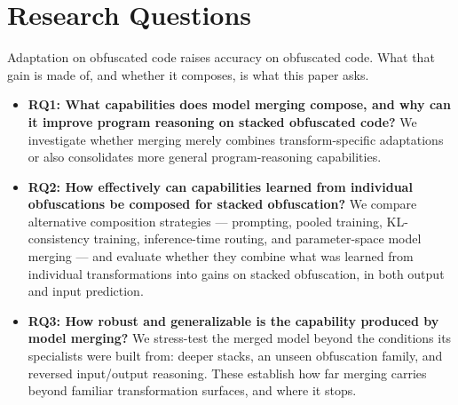 \section{Research Questions}
\label{sec:rqs}

Adaptation on obfuscated code raises accuracy on obfuscated code. What that gain is made of, and
whether it composes, is what this paper asks.

\begin{itemize}[leftmargin=*, topsep=2pt, itemsep=3pt]
  \item \textbf{RQ1: What capabilities does model merging compose, and why can it improve program
        reasoning on stacked obfuscated code?} We investigate whether merging merely combines
        transform-specific adaptations or also consolidates more general program-reasoning
        capabilities.

  \item \textbf{RQ2: How effectively can capabilities learned from individual obfuscations be
        composed for stacked obfuscation?} We compare alternative composition strategies ---
        prompting, pooled training, KL-consistency training, inference-time routing, and
        parameter-space model merging --- and evaluate whether they combine what was learned from
        individual transformations into gains on stacked obfuscation, in both output and input
        prediction.

  \item \textbf{RQ3: How robust and generalizable is the capability produced by model merging?} We
        stress-test the merged model beyond the conditions its specialists were built from: deeper
        stacks, an unseen obfuscation family, and reversed input/output reasoning. These establish
        how far merging carries beyond familiar transformation surfaces, and where it stops.
\end{itemize}
